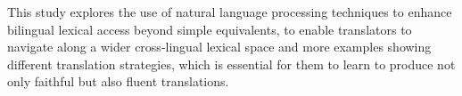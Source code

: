 This study explores the use of natural language processing techniques to enhance bilingual lexical access beyond simple equivalents, to enable translators to navigate along a wider cross-lingual lexical space and more examples showing different translation strategies, which is essential for them to learn to produce not only faithful but also fluent translations.
